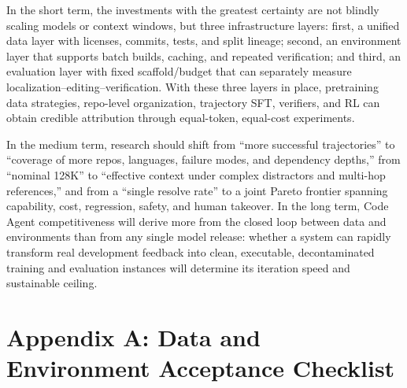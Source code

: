 \documentclass[10pt,a4paper,UTF8,fontset=none]{ctexart}
\def\BilingualAnchorPrefix{en}
\let\BilingualOriginalAppendix\appendix
\renewcommand{\appendix}{%
  \BilingualOriginalAppendix
  \renewcommand*{\theHsection}{\BilingualAnchorPrefix.appendix.\Alph{section}}%
  \renewcommand*{\theHsubsection}{\BilingualAnchorPrefix.appendix.\Alph{section}.\arabic{subsection}}%
  \renewcommand*{\theHsubsubsection}{\BilingualAnchorPrefix.appendix.\Alph{section}.\arabic{subsection}.\arabic{subsubsection}}%
}
\begin{document}
In the short term, the investments with the greatest certainty are not blindly scaling models or context windows, but three infrastructure layers: first, a unified data layer with licenses, commits, tests, and split lineage; second, an environment layer that supports batch builds, caching, and repeated verification; and third, an evaluation layer with fixed scaffold/budget that can separately measure localization--editing--verification. With these three layers in place, pretraining data strategies, repo-level organization, trajectory SFT, verifiers, and RL can obtain credible attribution through equal-token, equal-cost experiments.

In the medium term, research should shift from ``more successful trajectories'' to ``coverage of more repos, languages, failure modes, and dependency depths,'' from ``nominal 128K'' to ``effective context under complex distractors and multi-hop references,'' and from a ``single resolve rate'' to a joint Pareto frontier spanning capability, cost, regression, safety, and human takeover. In the long term, Code Agent competitiveness will derive more from the closed loop between data and environments than from any single model release: whether a system can rapidly transform real development feedback into clean, executable, decontaminated training and evaluation instances will determine its iteration speed and sustainable ceiling.

\clearpage
\appendix
\section{Appendix A: Data and Environment Acceptance Checklist}
\end{document}
